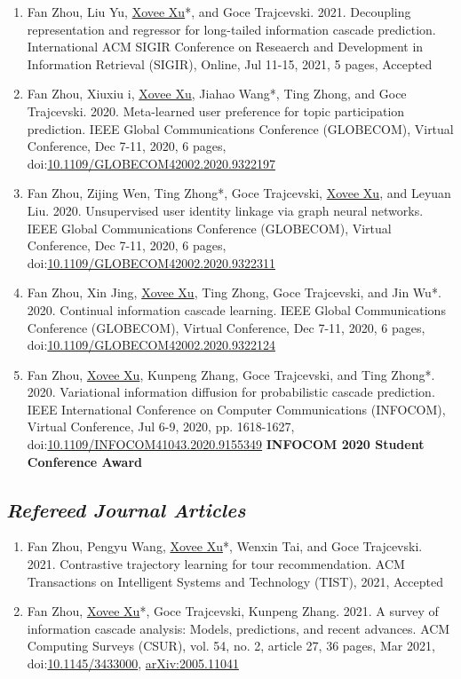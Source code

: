\begin{enumerate}
    \item Fan Zhou, Liu Yu, \underline{Xovee Xu}*, and Goce Trajcevski. 2021. Decoupling representation and regressor for long-tailed information cascade prediction. International ACM SIGIR Conference on Reseaerch and Development in Information Retrieval (SIGIR), Online, Jul 11-15, 2021, 5 pages, Accepted
    \item Fan Zhou, Xiuxiu \swashQ i, \underline{Xovee Xu}, Jiahao Wang*, Ting Zhong, and Goce Trajcevski. 2020. Meta-learned user preference for topic participation prediction. IEEE Global Communications Conference (GLOBECOM), Virtual Conference, Dec 7-11, 2020, 6 pages, doi:\href{https://doi.org/10.1109/GLOBECOM42002.2020.9322197}{10.1109/GLOBECOM42002.2020.9322197}
    \item Fan Zhou, Zijing Wen, Ting Zhong*, Goce Trajcevski, \underline{Xovee Xu}, and Leyuan Liu. 2020. Unsupervised user identity linkage via graph neural networks. IEEE Global Communications Conference (GLOBECOM), Virtual Conference, Dec 7-11, 2020, 6 pages, doi:\href{https://doi.org/10.1109/GLOBECOM42002.2020.9322311}{10.1109/GLOBECOM42002.2020.9322311}
    \item Fan Zhou, Xin Jing, \underline{Xovee Xu}, Ting Zhong, Goce Trajcevski, and Jin Wu*. 2020. Continual information cascade learning. IEEE Global Communications Conference (GLOBECOM), Virtual Conference, Dec 7-11, 2020, 6 pages, doi:\href{https://doi.org/10.1109/GLOBECOM42002.2020.9322124}{10.1109/GLOBECOM42002.2020.9322124}
    \item Fan Zhou, \underline{Xovee Xu}, Kunpeng Zhang, Goce Trajcevski, and Ting Zhong*. 2020. Variational information diffusion for probabilistic cascade prediction. IEEE International Conference on Computer Communications (INFOCOM), Virtual Conference, Jul 6-9, 2020, pp. 1618-1627, doi:\href{https://doi.org/10.1109/INFOCOM41043.2020.9155349}{10.1109/INFOCOM41043.2020.9155349}
    \newline \textbf{\color{red}INFOCOM 2020 Student Conference Award}
\end{enumerate}

\subsection*{\textnormal{\textit{Refereed Journal Articles}}}

\begin{enumerate}[resume]
    \item Fan Zhou, Pengyu Wang, \underline{Xovee Xu}*, Wenxin Tai, and Goce Trajcevski. 2021. Contrastive trajectory learning for tour recommendation. ACM Transactions on Intelligent Systems and Technology (TIST), 2021, Accepted
    \item Fan Zhou, \underline{Xovee Xu}*, Goce Trajcevski, Kunpeng Zhang. 2021. A survey of information cascade analysis: Models, predictions, and recent advances. ACM Computing Surveys (CSUR), vol. 54, no. 2, article 27, 36 pages, Mar 2021, doi:\href{https://xovee.cn/html/paper-redirects/csur2021.html}{10.1145/3433000}, \href{https://arxiv.org/abs/2005.11041}{arXiv:2005.11041}
\end{enumerate}

